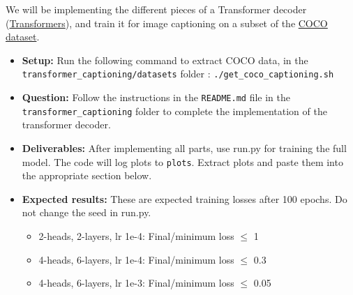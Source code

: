 \documentclass[11pt,addpoints,answers]{exam}
\numberwithin{equation}{section} %
\numberwithin{figure}{section} %
\numberwithin{table}{section} %
\begin{document}
We will be implementing the different pieces of a Transformer decoder (\href{https://arxiv.org/pdf/1706.03762.pdf}{Transformers}), and train it for image captioning on a subset of the \href{https://cocodataset.org/#home}{COCO dataset}. 
\begin{itemize}
    \item \textbf{Setup:} Run the following command to extract COCO data, in the \texttt{transformer\_captioning/datasets} folder : \texttt{./get\_coco\_captioning.sh}
\item \textbf{Question:} Follow the instructions in the \texttt{README.md} file in the \texttt{transformer\_captioning} folder to complete the implementation of the transformer decoder.
\item \textbf{Deliverables:} After implementing all parts, use run.py for training the full model. The code will log plots to \texttt{plots}. Extract plots and paste them into the appropriate section below. 

\item \textbf{Expected results:}
    These are expected training losses after 100 epochs. Do not change the seed in run.py.
    \begin{itemize}
        \item 2-heads, 2-layers, lr 1e-4: Final/minimum loss $\leq$ 1 
        \item 4-heads, 6-layers, lr 1e-4: Final/minimum loss $\leq$ 0.3 
        \item 4-heads, 6-layers, lr 1e-3: Final/minimum loss $\leq$ 0.05
    \end{itemize}
\end{itemize}
\end{document}
